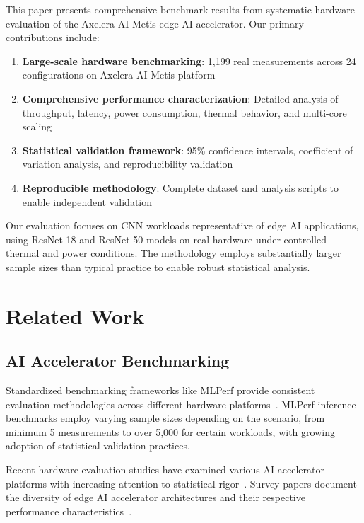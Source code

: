 \documentclass[journal]{IEEEtran}
\begin{document}
This paper presents comprehensive benchmark results from systematic hardware evaluation of the Axelera AI Metis edge AI accelerator. Our primary contributions include:

\begin{enumerate}
    \item \textbf{Large-scale hardware benchmarking}: 1,199 real measurements across 24 configurations on Axelera AI Metis platform
    \item \textbf{Comprehensive performance characterization}: Detailed analysis of throughput, latency, power consumption, thermal behavior, and multi-core scaling
    \item \textbf{Statistical validation framework}: 95\% confidence intervals, coefficient of variation analysis, and reproducibility validation
    \item \textbf{Reproducible methodology}: Complete dataset and analysis scripts to enable independent validation
\end{enumerate}

Our evaluation focuses on CNN workloads representative of edge AI applications, using ResNet-18 and ResNet-50 models on real hardware under controlled thermal and power conditions. The methodology employs substantially larger sample sizes than typical practice to enable robust statistical analysis.

\section{Related Work}

\subsection{AI Accelerator Benchmarking}

Standardized benchmarking frameworks like MLPerf provide consistent evaluation methodologies across different hardware platforms~\cite{isca_benchmark2020,mlperf_training2020}. MLPerf inference benchmarks employ varying sample sizes depending on the scenario, from minimum 5 measurements to over 5,000 for certain workloads, with growing adoption of statistical validation practices.

Recent hardware evaluation studies have examined various AI accelerator platforms with increasing attention to statistical rigor~\cite{benchmarking_edge2024}. Survey papers document the diversity of edge AI accelerator architectures and their respective performance characteristics~\cite{optimization_survey2025,edge_computing_survey2024}.
\end{document}
